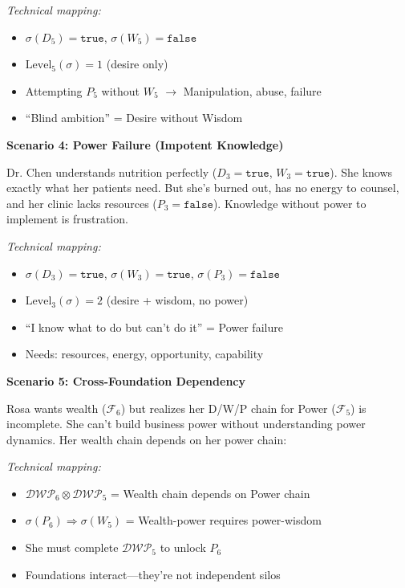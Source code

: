 \documentclass[11pt,twoside]{book}
\newcommand{\Foundations}{\mathcal{F}}
\newcommand{\DWP}{\mathcal{DWP}}
\begin{document}
\begin{tcolorbox}[colback=yellow!5!white,colframe=yellow!65!black,title=\textbf{Real-Life Scenarios: D/W/P Chains},breakable]
\textit{Technical mapping:}
\begin{itemize}
    \item $\sigma(D_5) = \mathtt{true}$, $\sigma(W_5) = \mathtt{false}$
    \item $\mathrm{Level}_5(\sigma) = 1$ (desire only)
    \item Attempting $P_5$ without $W_5$ $\to$ Manipulation, abuse, failure
    \item ``Blind ambition'' = Desire without Wisdom
\end{itemize}

\textbf{Scenario 4: Power Failure (Impotent Knowledge)}

Dr. Chen understands nutrition perfectly ($D_3 = \mathtt{true}$, $W_3 = \mathtt{true}$). She knows exactly what her patients need. But she's burned out, has no energy to counsel, and her clinic lacks resources ($P_3 = \mathtt{false}$). Knowledge without power to implement is frustration.

\textit{Technical mapping:}
\begin{itemize}
    \item $\sigma(D_3) = \mathtt{true}$, $\sigma(W_3) = \mathtt{true}$, $\sigma(P_3) = \mathtt{false}$
    \item $\mathrm{Level}_3(\sigma) = 2$ (desire + wisdom, no power)
    \item ``I know what to do but can't do it'' = Power failure
    \item Needs: resources, energy, opportunity, capability
\end{itemize}

\textbf{Scenario 5: Cross-Foundation Dependency}

Rosa wants wealth ($\Foundations_6$) but realizes her D/W/P chain for Power ($\Foundations_5$) is incomplete. She can't build business power without understanding power dynamics. Her wealth chain depends on her power chain:

\textit{Technical mapping:}
\begin{itemize}
    \item $\DWP_6 \otimes \DWP_5$ = Wealth chain depends on Power chain
    \item $\sigma(P_6) \Rightarrow \sigma(W_5)$ = Wealth-power requires power-wisdom
    \item She must complete $\DWP_5$ to unlock $P_6$
    \item Foundations interact---they're not independent silos
\end{itemize}


\end{tcolorbox}
\end{document}
